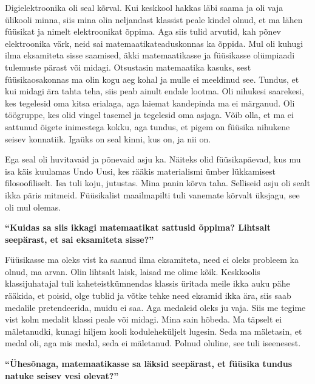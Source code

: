 Digielektroonika oli seal kõrval. Kui keskkool hakkas läbi saama ja oli vaja
ülikooli minna, siis mina olin neljandast klassist peale kindel olnud, et ma
lähen füüsikat ja nimelt elektroonikat õppima. Aga siis tulid arvutid, kah
põnev elektroonika värk, neid sai matemaatikateaduskonnas ka õppida. Mul oli
kuhugi ilma eksamiteta sisse saamised, äkki matemaatikasse ja füüsikasse
olümpiaadi tulemuste pärast või midagi. Otsustasin matemaatika kasuks, sest
füüsikaosakonnas ma olin kogu aeg kohal ja mulle ei meeldinud see. Tundus, et
kui midagi ära tahta teha, siis peab ainult endale lootma. Oli nihukesi
saarekesi, kes tegelesid oma kitsa erialaga, aga laiemat kandepinda ma ei
märganud. Oli töögruppe, kes olid vingel tasemel ja tegelesid oma asjaga. Võib
olla, et ma ei sattunud õigete inimestega kokku, aga tundus, et pigem on
füüsika nihukene seisev konnatiik. Igaüks on seal kinni, kus on, ja nii on.

Ega seal oli huvitavaid ja põnevaid asju ka. Näiteks olid füüsikapäevad, kus mu
isa käis kuulamas Undo Uusi, kes rääkis materialismi
ümber lükkamisest filosoofiliselt. Isa tuli koju, jutustas. Mina panin kõrva
taha. Selliseid asju oli sealt ikka päris mitmeid. Füüsikalist maailmapilti
tuli vanemate kõrvalt üksjagu, see oli mul olemas.

\textbf{\enquote{Kuidas sa siis ikkagi matemaatikat sattusid õppima? Lihtsalt
seepärast, et sai eksamiteta sisse?}}

Füüsikasse ma oleks vist ka saanud ilma eksamiteta, need ei oleks probleem ka
olnud, ma arvan. Olin lihtsalt laisk, laisad me olime kõik. Keskkoolis
klassijuhatajal tuli kaheteistkümnendas klassis üritada meile ikka auku pähe
rääkida, et poisid, olge tublid ja võtke tehke need eksamid ikka ära, siis saab
medalile pretendeerida, muidu ei saa. Aga medaleid oleks ju vaja. Siis me
tegime vist kolm medalit klassi peale või midagi. Mina sain hõbeda. Ma täpselt
ei mäletanudki, kunagi hiljem kooli koduleheküljelt lugesin. Seda ma mäletasin,
et medal oli, aga mis medal, seda ei mäletanud. Polnud oluline, see tuli
iseenesest.

\textbf{\enquote{Ühesõnaga, matemaatikasse sa läksid seepärast, et füüsika
tundus natuke seisev vesi olevat?}}


